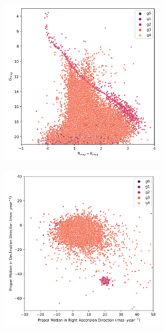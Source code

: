 \documentclass[11pt,a4paper,english,twocolumn]{article}
\begin{document}
\begin{figure}[htbp]
\begin{subfigure}{\columnwidth}
\begin{subfigure}[t]{0.30\textwidth}
    \end{subfigure}
    \hfill
    \begin{subfigure}[t]{0.30\textwidth}
      \centering
      \includegraphics[width=\textwidth]{../figures/melotte_22/dec_hr_diagram_melotte_22.png}
    \end{subfigure}
  \end{subfigure}
  \centering
  \begin{subfigure}{\columnwidth}
    \centering
    \begin{subfigure}[t]{0.30\textwidth}
      \centering
      \includegraphics[width=\textwidth]{../figures/melotte_22/dec_pm_filtered_melotte_22.png}

\end{subfigure}
\end{subfigure}
\end{figure}
\end{document}
